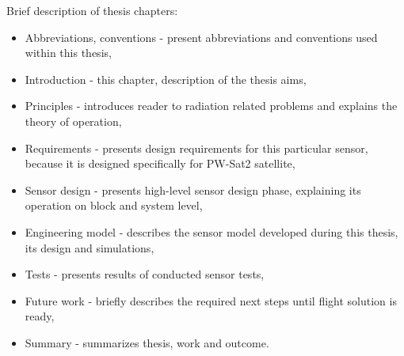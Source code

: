 \newpage
    Brief description of thesis chapters:
    \begin{itemize}
        \item Abbreviations, conventions - present abbreviations and conventions used within this thesis,
        \item Introduction - this chapter, description of the thesis aims,
        \item Principles - introduces reader to radiation related problems and explains the theory of operation,
        \item Requirements - presents design requirements for this particular sensor, because it is designed specifically for PW-Sat2 satellite,
        \item Sensor design - presents high-level sensor design phase, explaining its operation on block and system level,
        \item Engineering model - describes the sensor model developed during this thesis, its design and simulations,
        \item Tests - presents results of conducted sensor tests,
        \item Future work - briefly describes the required next steps until flight solution is ready,
        \item Summary - summarizes thesis, work and outcome.
    \end{itemize}
